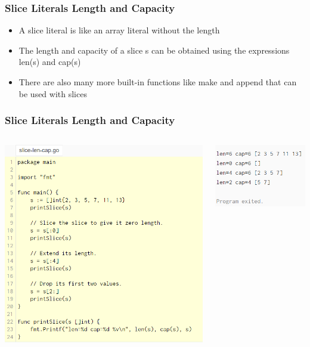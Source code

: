 \documentclass[14pt]{beamer}
\begin{document}
{
\begin{frame}
    \frametitle{Slice Literals Length and Capacity}
    \begin{itemize}
        \item A slice literal is like an array literal without the length
        \item The length and capacity of a slice s can be obtained using the expressions len(s) and cap(s)
        \item There are also many more built-in functions like make and append that can be used with slices
    \end{itemize}
\end{frame}
}

{
\begin{frame}
    \frametitle{Slice Literals Length and Capacity}
    \begin{columns}
        \begin{column}{0.6\textwidth}
        \includegraphics[width=\linewidth]{img/slicelencap.PNG}
        \end{column}
        \begin{column}{0.4\textwidth}
        \includegraphics[width=\linewidth]{img/slicelencapoutput.PNG}

\end{column}
\end{columns}
\end{frame}}
\end{document}
